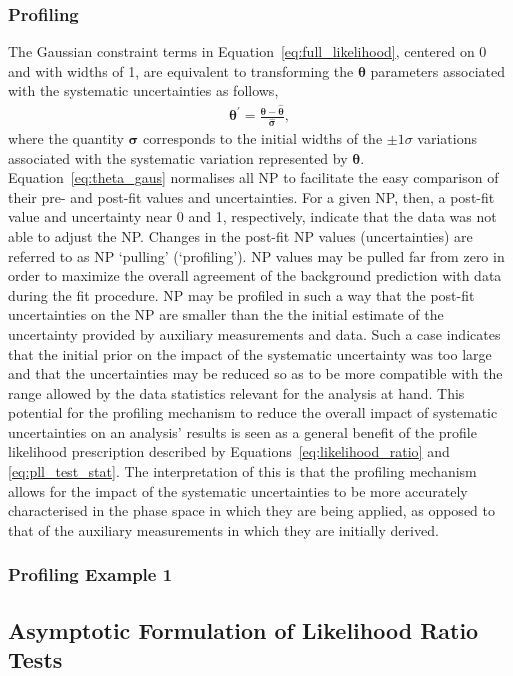 \subsubsection{Profiling}
\label{sec:profiling}

The Gaussian constraint terms in Equation~\ref{eq:full_likelihood}, centered on 0 and with widths of 1,
are equivalent to transforming the $\bm{\theta}$ parameters associated with the systematic uncertainties as follows,
\begin{align}
    \bm{\theta}^{\prime} = \frac{\bm{\theta} - \bm{\hat{\theta}}}{\bm{\hat{\sigma}}},
    \label{eq:theta_gaus}
\end{align}
where the quantity $\bm{\sigma}$ corresponds to the initial widths of the $\pm 1 \sigma$ variations
associated with the systematic variation represented by $\bm{\theta}$.
Equation~\ref{eq:theta_gaus} normalises all NP to facilitate the easy comparison of their pre- and post-fit values and uncertainties.
For a given NP, then, a post-fit value and uncertainty near 0 and 1, respectively, indicate
that the data was not able to adjust the NP.
Changes in the post-fit NP values (uncertainties) are referred to as NP `pulling' (`profiling').
NP values may be pulled far from zero in order to maximize the overall agreement of the background prediction
with data during the fit procedure.
NP may be profiled in such a way that the post-fit uncertainties on the NP are smaller than the
the initial estimate of the uncertainty provided by auxiliary measurements and data.
Such a case indicates that the initial prior on the impact of the systematic uncertainty was too
large and that the uncertainties may be reduced so as to be more compatible  with the range allowed by
the data statistics relevant for the analysis at hand.
This potential for the profiling mechanism to reduce the overall impact of systematic uncertainties
on an analysis' results is seen as a general benefit of the profile likelihood prescription described
by Equations~\ref{eq:likelihood_ratio} and \ref{eq:pll_test_stat}.
The interpretation of this is that the profiling mechanism allows for the impact of the systematic uncertainties
to be more accurately characterised in the phase space in which they are being applied, as opposed
to that of the auxiliary measurements in which they are initially derived.

\subsubsection{Profiling Example 1}
\label{sec:profiling_example_1}

{\color{red}{Not sure if I want this}}

\subsection{Asymptotic Formulation of Likelihood Ratio Tests}

{\color{red}{Describe the asympotitc formula used for the analysis to be presented and illustrate
examples of how various p values are obtained, as well as how analysis sensitivity is optimized}}
